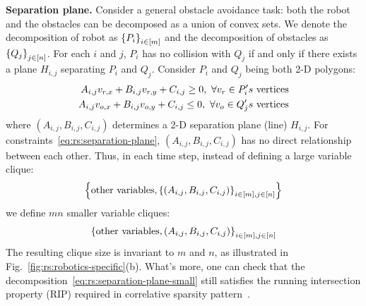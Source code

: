 \textbf{Separation plane.} Consider a general obstacle avoidance task: both the robot and the obstacles can be decomposed as a union of convex sets. We denote the decomposition of robot as $\left\{ P_i \right\}_{i \in \left[ m \right]}$ and the decomposition of obstacles as $\left\{ Q_j \right\}_{j \in \left[ n \right]}$. For each $i$ and $j$, $P_i$ has no collision with $Q_j$ if and only if there exists a plane $H_{i,j}$ separating $P_i$ and $Q_j$. Consider $P_i$ and $Q_j$ being both 2-D polygons:
\begin{align}
    \label{eq:rs:separation-plane}
    \vspace{-10mm} A_{i,j}  v_{r,x} + B_{i,j}  v_{r,y} + C_{i,j} \ge 0, \ \forall v_r \in P_i's \text{ vertices} \\
   \vspace{-10mm} A_{i,j} v_{o,x} + B_{i,j} v_{o,y} + C_{i,j} \le 0, \ \forall v_o \in Q_j's \text{ vertices}
\end{align}
where $(A_{i,j}, B_{i,j}, C_{i,j})$ determines a 2-D separation plane (line) $H_{i,j}$. 
For constraints~\eqref{eq:rs:separation-plane}, $(A_{i,j}, B_{i,j}, C_{i,j})$ has no direct relationship between each other. Thus, in each time step, instead of defining a large variable clique:
\begin{align}
    \label{eq:rs:separation-plane-large}
    \left\{ \text{other variables}, \left\{ (A_{i,j}, B_{i,j}, C_{i,j}) \right\}_{i \in \left[ m \right], j \in \left[ n \right]} \right\}
\end{align}
we define $mn$ smaller variable cliques:
\begin{align}
    \label{eq:rs:separation-plane-small}
    \left\{ 
        \text{other variables}, (A_{i,j}, B_{i,j}, C_{i,j})
     \right\}_{i \in \left[ m \right], j \in \left[ n \right]}
\end{align}
The resulting clique size is invariant to $m$ and $n$, as illustrated in Fig.~\ref{fig:rs:robotics-specific}(b). 
What's more, one can check that the decomposition~\eqref{eq:rs:separation-plane-small} still satisfies the running intersection property (RIP) required in correlative sparsity pattern~\cite{lasserre2006msc-correlativesparse}.



